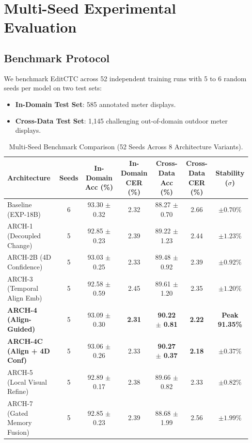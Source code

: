 \section{Multi-Seed Experimental Evaluation}
\label{sec:experiments}

\subsection{Benchmark Protocol}
We benchmark EditCTC across 52 independent training runs with 5 to 6 random seeds per model on two test sets:
\begin{itemize}
    \item \textbf{In-Domain Test Set}: 585 annotated meter displays.
    \item \textbf{Cross-Data Test Set}: 1,145 challenging out-of-domain outdoor meter displays.
\end{itemize}

\begin{table}[t]
\centering
\small
\caption{Multi-Seed Benchmark Comparison (52 Seeds Across 8 Architecture Variants).}
\label{tab:multiseed}
\begin{tabular}{lcccccc}
\toprule
\textbf{Architecture} & \textbf{Seeds} & \textbf{In-Domain Acc (\%)} & \textbf{In-Domain CER (\%)} & \textbf{Cross-Data Acc (\%)} & \textbf{Cross-Data CER (\%)} & \textbf{Stability ($\sigma$)} \\
\midrule
Baseline (EXP-18B) & 6 & 93.30 $\pm$ 0.32 & 2.32 & 88.27 $\pm$ 0.70 & 2.66 & $\pm 0.70\%$ \\
ARCH-1 (Decoupled Change) & 5 & 92.85 $\pm$ 0.23 & 2.39 & 89.22 $\pm$ 1.23 & 2.44 & $\pm 1.23\%$ \\
ARCH-2B (4D Confidence) & 5 & 93.03 $\pm$ 0.25 & 2.33 & 89.48 $\pm$ 0.92 & 2.39 & $\pm 0.92\%$ \\
ARCH-3 (Temporal Align Emb) & 5 & 92.58 $\pm$ 0.59 & 2.45 & 89.61 $\pm$ 1.20 & 2.35 & $\pm 1.20\%$ \\
\textbf{ARCH-4 (Align-Guided)} & 5 & 93.09 $\pm$ 0.30 & \textbf{2.31} & \textbf{90.22 $\pm$ 0.81} & \textbf{2.22} & \textbf{Peak 91.35\%} \\
\textbf{ARCH-4C (Align + 4D Conf)} & 5 & 93.06 $\pm$ 0.26 & 2.33 & \textbf{90.27 $\pm$ 0.37} & \textbf{2.18} & \textbf{$\pm \mathbf{0.37\%}$} \\
ARCH-5 (Local Visual Refine) & 5 & 92.89 $\pm$ 0.17 & 2.38 & 89.66 $\pm$ 0.82 & 2.33 & $\pm 0.82\%$ \\
ARCH-7 (Gated Memory Fusion) & 5 & 92.85 $\pm$ 0.23 & 2.39 & 88.68 $\pm$ 1.99 & 2.56 & $\pm 1.99\%$ \\
\bottomrule
\end{tabular}
\end{table}

